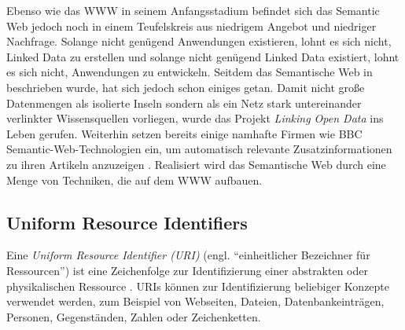 Ebenso wie das WWW in seinem Anfangsstadium befindet sich das Semantic Web jedoch noch in einem Teufelskreis aus niedrigem Angebot und niedriger Nachfrage.
Solange nicht genügend Anwendungen existieren, lohnt es sich nicht, Linked Data zu erstellen und solange nicht genügend Linked Data existiert, lohnt es sich nicht, Anwendungen zu entwickeln.
Seitdem das Semantische Web in \citet{www-semantic-web-proposal} beschrieben wurde, hat sich jedoch schon einiges getan.
Damit nicht große Datenmengen als isolierte Inseln sondern als ein Netz stark untereinander verlinkter Wissensquellen vorliegen, wurde das Projekt \emph{Linking Open Data} ins Leben gerufen.
Weiterhin setzen bereits einige namhafte Firmen wie BBC Semantic-Web-Technologien ein, um automatisch relevante Zusatzinformationen zu ihren Artikeln anzuzeigen \citep{bbc}.
Realisiert wird das Semantische Web durch eine Menge von Techniken, die auf dem WWW aufbauen.
\subsection{Uniform Resource Identifiers}
Eine \emph{Uniform Resource Identifier (URI)} (engl. "`einheitlicher Bezeichner für Ressourcen"') ist eine Zeichenfolge zur Identifizierung einer abstrakten oder physikalischen Ressource \citep{www-uri}.
URIs können zur Identifizierung beliebiger Konzepte verwendet werden, zum Beispiel von Webseiten, Dateien, 
Datenbankeinträgen, Personen, Gegenständen, Zahlen oder Zeichenketten.


